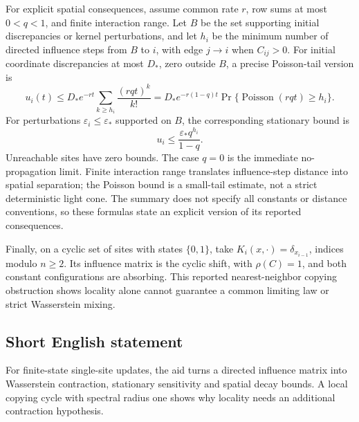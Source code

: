 \documentclass[11pt]{article}
\begin{document}
For explicit spatial consequences, assume common rate \(r\), row sums at most \(0<q<1\), and finite interaction range. Let \(B\) be the set supporting initial discrepancies or kernel perturbations, and let \(h_i\) be the minimum number of directed influence steps from \(B\) to \(i\), with edge \(j\to i\) when \(C_{ij}>0\). For initial coordinate discrepancies at most \(D_*\), zero outside \(B\), a precise Poisson-tail version is
\[
 u_i(t)\leq D_*e^{-rt}\sum_{k\geq h_i}\frac{(rqt)^k}{k!}
 =D_*e^{-r(1-q)t}\Pr\{\operatorname{Poisson}(rqt)\geq h_i\}.
\]
For perturbations \(\varepsilon_i\leq\varepsilon_*\) supported on \(B\), the corresponding stationary bound is
\[
 u_i\leq\frac{\varepsilon_*q^{h_i}}{1-q}.
\]
Unreachable sites have zero bounds. The case \(q=0\) is the immediate no-propagation limit. Finite interaction range translates influence-step distance into spatial separation; the Poisson bound is a small-tail estimate, not a strict deterministic light cone. The summary does not specify all constants or distance conventions, so these formulas state an explicit version of its reported consequences.

Finally, on a cyclic set of sites with states \(\{0,1\}\), take \(K_i(x,\cdot)=\delta_{x_{i-1}}\), indices modulo \(n\geq2\). Its influence matrix is the cyclic shift, with \(\rho(C)=1\), and both constant configurations are absorbing. This reported nearest-neighbor copying obstruction shows locality alone cannot guarantee a common limiting law or strict Wasserstein mixing.
\subsection{Short English statement}
For finite-state single-site updates, the aid turns a directed influence matrix into Wasserstein contraction, stationary sensitivity and spatial decay bounds. A local copying cycle with spectral radius one shows why locality needs an additional contraction hypothesis.
\end{document}
